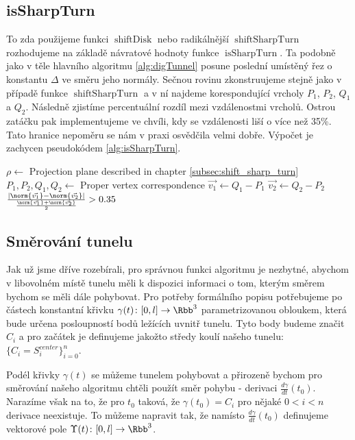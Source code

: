 \subsection{isSharpTurn} \label{subsec:is_sharp_turn}
To zda použijeme funkci $ \operatorname{shiftDisk} $ nebo radikálnější
$ \operatorname{shiftSharpTurn} $ rozhodujeme na základě návratové hodnoty
funkce $ \operatorname{isSharpTurn} $. Ta podobně jako v těle hlavního
algoritmu \ref{alg:digTunnel} posune poslední umístěný řez o konstantu
$ \Delta $ ve směru jeho normály. Sečnou rovinu zkonstruujeme stejně jako v
případě funkce $ \operatorname{shiftSharpTurn} $ a v ní najdeme korespondující
vrcholy $ P_1$, $P_2$, $Q_1$ a $ Q_2 $. Následně zjistíme percentuální rozdíl
mezi vzdálenostmi vrcholů. Ostrou zatáčku pak implementujeme ve chvíli, kdy se
vzdálenosti liší o více než 35\%. Tato hranice nepoměru se nám v praxi osvědčila
velmi dobře. Výpočet je zachycen pseudokódem \ref{alg:isSharpTurn}.

\begin{algorithmic}[1]
\label{alg:isSharpTurn}

    \State $ \rho \gets $ Projection plane described in chapter \ref{subsec:shift_sharp_turn}
    \State $ P_1, P_2, Q_1, Q_2 \gets $ Proper vertex correspondence
    \State $ \vec{v_1} \gets Q_1 - P_1 $
    \State $ \vec{v_2} \gets Q_2 - P_2 $
    \State \Return $ \frac{\left| \norm{\vec{v_1}} - \norm{\vec{v_2}} \right|}
                          {\frac{\norm{\vec{v_1}} + \norm{\vec{v_2}}}{2}} > 0.35$
\EndFunction

\end{algorithmic}





\subsection{Směrování tunelu} \label{subsec:tunnel_dir}
Jak už jsme dříve rozebírali, pro správnou funkci algoritmu je nezbytné, abychom
v libovolném místě tunelu měli k dispozici informaci o tom, kterým směrem bychom
se měli dále pohybovat. Pro potřeby formálního popisu potřebujeme
po částech konstantní křivku $ \gamma(t) \colon [0, l] \to \Rbb^3$
parametrizovanou obloukem, která bude
určena posloupností bodů ležících uvnitř tunelu. Tyto body budeme značit
$ C_i $ a pro začátek je definujeme jakožto středy koulí našeho tunelu:
$ \{C_i = S_i^{center}\}_{i=0}^{n} $.

Podél křivky $ \gamma(t) $ se můžeme tunelem pohybovat a přirozeně bychom pro
směrování našeho algoritmu chtěli použít směr pohybu - derivaci
$ \frac{d\gamma}{dt}(t_0) $. Narazíme však na to, že pro $ t_0 $ taková, že
$ \gamma(t_0) = C_i $ pro nějaké $ 0 < i < n $ derivace neexistuje. To můžeme
napravit tak, že namísto $ \frac{d\gamma}{dt}(t_0) $ definujeme vektorové
pole $ \Upsilon(t) \colon [0, l] \to \Rbb^3 $.

